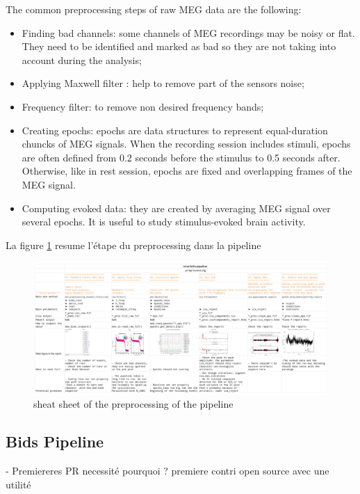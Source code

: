 The common preprocessing steps of raw MEG data are the following:
\begin{itemize}
    \item Finding bad channels: some channels of MEG recordings may be noisy or flat. They need to be identified and marked as bad so they are not taking into account during the analysis;
    \item Applying Maxwell filter : help to remove part of the sensors noise;
    \item Frequency filter: to remove non desired frequency bands;
    \item Creating epochs: epochs are data structures to represent equal-duration chuncks of MEG
          signals. When the recording session includes stimuli, epochs are often defined from 0.2 seconds
          before the stimulus to 0.5 seconds after. Otherwise, like in rest session, epochs are fixed and
          overlapping frames of the MEG signal.
    \item Computing evoked data: they are created by averaging MEG signal over several epochs. It is useful to study stimulus-evoked brain activity.
\end{itemize}


La figure \ref{cheat_sheet} resume l'étape du preprocessing dans la pipeline

\begin{figure}[ht]
    \centering
    \includegraphics[width=15cm]{images_report/preprocessing/cheatsheet preprocessing.png}
    \caption[sheat sheet of the preprocessing of the pipeline]%
    {sheat sheet of the preprocessing of the pipeline}

    \label{cheat_sheet}
\end{figure}


\subsection{Bids Pipeline}
- Premiereres PR necessité pourquoi ?
premiere contri open source
avec une utilité

